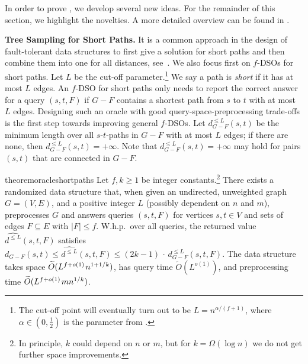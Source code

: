 \documentclass{article}\usepackage[a4paper,margin=20mm]{geometry}
\newcommand{\RestateRemark}[1]{{\normalfont\bfseries #1}}
\newcommand{\RestateInit}[1]{\newcommand{#1}{}}
\newcommand*{\Otilde}{\widetilde{O}}
\newcommand*{\nwspace}{\hspace*{.1em}}
\renewcommand{\le}{\leqslant}
\renewcommand{\ge}{\geqslant}
\begin{document}
In order to prove , we develop several new ideas.
For the remainder of this section, we highlight the novelties.
A more detailed overview
can be found in .
\vspace*{.5em}

\noindent
\textbf{Tree Sampling for Short Paths.}
It is a common approach in the design of fault-tolerant data structures
to first give a solution for short paths and then combine them into one for all distances,
see~\cite{ChCo20, KarthikParter21DeterministicRPC, GrandoniVWilliamsFasterRPandDSO_journal, GuRen21, Ren22Improved, WY13}.
We also focus first on $f$-DSOs for short paths.
Let $L$ be the cut-off parameter.\footnote{%
	The cut-off point will eventually turn out to be $L = n^{\alpha/(f+1)}$,
	where $\alpha \in (0,\frac{1}{2})$ is the parameter from .
} 
We say a path is \emph{short} if it has at most $L$ edges.
An $f$-DSO for short paths only needs to report the correct answer for a query $(s,t,F)$
if $G-F$ contains a shortest path from $s$ to $t$ with at most $L$ edges. 
%	
	Designing such an oracle with good query-space-preprocessing trade-offs 
	is the first step towards improving general $f$-DSOs. 
    Let $d_{G-F}^{\le L}(s,t)$ be the minimum length over all $s$-$t$-paths in $G-F$ with at most $L$ edges; if there are none, then $d_{G-F}^{\le L}(s,t) = +\infty$.
    Note that $d_{G-F}^{\le L}(s,t) = +\infty$ may hold for pairs $(s,t)$
    that are connected in $G-F$.
\begin{restatable}{theorem}{oracleshortpaths}
\label{thm:oracle_short_paths}%
  Let $f, k \ge 1$ be integer constants.\footnote{%
  In principle, $k$ could depend on $n$ or $m$,
  but for $k = \Omega(\log n)$ we do not get further space improvements.
}
  There exists a randomized data structure that,
  when given an undirected, unweighted graph $G = (V,E)$, 
  and a positive integer $L$ (possibly dependent on $n$ and $m$),
  preprocesses $G$ and answers queries $(s,t,F)$ 
  for vertices $s,t \in V$ and sets of edges $F \subseteq E$ with $|F| \le f$.
  W.h.p.\ over all queries,
  the returned value $\widehat{d^{\le L}}(s,t,F)$ satisfies 
  $d_{G-F}(s,t) \le \widehat{d^{\le L}}(s,t,F) \le (2k{-}1) \,{\cdot}\,d_{G-F}^{\le L}(s,t,F)$.
  The data structure takes space $\Otilde(L^{f+o(1)} \nwspace n^{1+1/k})$, 
  has query time $\Otilde(L^{o(1)})$, 
    and preprocessing time $\Otilde(L^{f+o(1)} \nwspace mn^{1/k})$.
\end{restatable}
\end{document}
